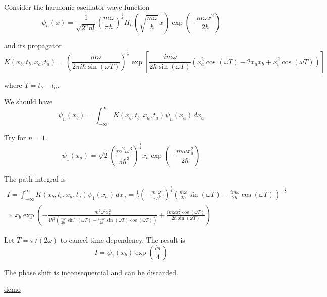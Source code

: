 

Consider the harmonic oscillator wave function
\begin{equation*}
\psi_n(x)=\frac{1}{\sqrt{2^nn!}}\left(\frac{m\omega}{\pi\hbar}\right)^\frac{1}{4}
H_n\left(\sqrt{\frac{m\omega}{\hbar}}\,x\right)
\exp\left(-\frac{m\omega x^2}{2\hbar}\right)
\end{equation*}

and its propagator
\begin{equation*}
K(x_b,t_b,x_a,t_a)
=\left(\frac{m\omega}{2\pi i\hbar\sin(\omega T)}\right)^\frac{1}{2}
\exp\left[
\frac{im\omega}{2\hbar\sin(\omega T)}
\left(x_a^2\cos(\omega T)-2x_ax_b+x_b^2\cos(\omega T)\right)
\right]
\end{equation*}

where $T=t_b-t_a$.

\bigskip
We should have
\begin{equation*}
\psi_n(x_b)=\int_{-\infty}^\infty K(x_b,t_b,x_a,t_a)\psi_n(x_a)\,dx_a
\end{equation*}

Try for $n=1$.
\begin{equation*}
\psi_1(x_a)=\sqrt2\left(\frac{m^2\omega^3}{\pi\hbar^3}\right)^\frac{1}{4}
x_a\exp\left(-\frac{m\omega x_a^2}{2\hbar}\right)
\end{equation*}

The path integral is
\begin{multline*}
I=\int_{-\infty}^\infty K(x_b,t_b,x_a,t_a)\psi_1(x_a)\,dx_a
=\frac{1}{2}\left(-\frac{m^9\omega^9}{\pi\hbar^9}\right)^\frac{1}{4}
\left(\frac{m\omega}{2\hbar}\sin(\omega T)
-\frac{im\omega}{2\hbar}\cos(\omega T)\right)^{-\frac{3}{2}}
\\{}\times
x_b\exp\left(
-\frac{m^2\omega^2x_b^2}
{4\hbar^2\left(\frac{m\omega}{2\hbar}\sin^2(\omega T)
-\frac{im\omega}{2\hbar}\sin(\omega T)\cos(\omega T)\right)}
+\frac{im\omega x_b^2\cos(\omega T)}{2\hbar\sin(\omega T)}
\right)
\end{multline*}

Let $T=\pi/(2\omega)$ to cancel time dependency.
The result is
\begin{equation*}
I=\psi_1(x_b)\exp\left(\frac{i\pi}{4}\right)
\end{equation*}

The phase shift is inconsequential and can be discarded.

\bigskip
\href{https://georgeweigt.github.io/blog/10.html}{demo}

